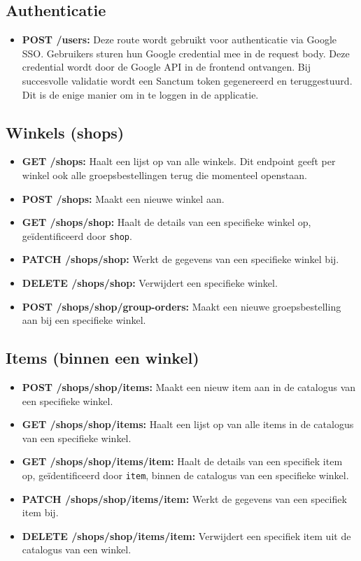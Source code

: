\subsection{Authenticatie}

\begin{itemize}
  \item \textbf{POST /users:} Deze route wordt gebruikt voor authenticatie via Google SSO. Gebruikers sturen hun Google credential mee in de request body. Deze credential wordt door de Google API in de frontend ontvangen. Bij succesvolle validatie wordt een Sanctum token gegenereerd en teruggestuurd. Dit is de enige manier om in te loggen in de applicatie.
\end{itemize}

\subsection{Winkels (shops)}

\begin{itemize}
  \item \textbf{GET /shops:} Haalt een lijst op van alle winkels. Dit endpoint geeft per winkel ook alle groepsbestellingen terug die momenteel openstaan.
  \item \textbf{POST /shops:} Maakt een nieuwe winkel aan.
  \item \textbf{GET /shops/{shop}:} Haalt de details van een specifieke winkel op, geïdentificeerd door \texttt{{shop}}.
  \item \textbf{PATCH /shops/{shop}:} Werkt de gegevens van een specifieke winkel bij.
  \item \textbf{DELETE /shops/{shop}:} Verwijdert een specifieke winkel.
  \item \textbf{POST /shops/{shop}/group-orders:} Maakt een nieuwe groepsbestelling aan bij een specifieke winkel.
\end{itemize}

\subsection{Items (binnen een winkel)}

\begin{itemize}
  \item \textbf{POST /shops/{shop}/items:} Maakt een nieuw item aan in de catalogus van een specifieke winkel.
  \item \textbf{GET /shops/{shop}/items:} Haalt een lijst op van alle items in de catalogus van een specifieke winkel.
  \item \textbf{GET /shops/{shop}/items/{item}:} Haalt de details van een specifiek item op, geïdentificeerd door \texttt{{item}}, binnen de catalogus van een specifieke winkel.
  \item \textbf{PATCH /shops/{shop}/items/{item}:} Werkt de gegevens van een specifiek item bij.
  \item \textbf{DELETE /shops/{shop}/items/{item}:} Verwijdert een specifiek item uit de catalogus van een winkel.
\end{itemize}

